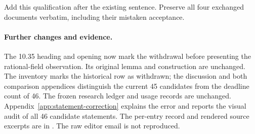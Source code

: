 Add this qualification after the existing sentence. Preserve all four exchanged documents verbatim, including their mistaken acceptance.


\paragraph{Further changes and evidence.}
The 10.35 heading and opening now mark the withdrawal before presenting
the rational-field observation. Its original lemma and construction are
unchanged. The inventory marks the historical row as withdrawn; the
discussion and both comparison appendices distinguish the current
45 candidates from the deadline count of 46. The frozen research ledger
and usage records are unchanged. Appendix~\ref{app:statement-correction}
explains the error and reports the visual audit of all 46 candidate
statements. The per-entry record and rendered source excerpts are in
. The raw editor email is not reproduced.
